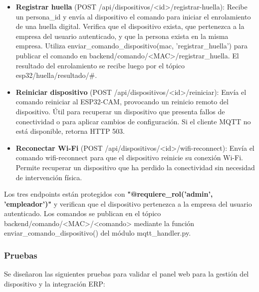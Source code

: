 \begin{itemize}
    \item \textbf{Registrar huella} (POST /api/dispositivos/<id>/registrar-huella): Recibe un persona\_id y envía al dispositivo el comando para iniciar el enrolamiento de una huella digital. Verifica que el dispositivo exista, que pertenezca a la empresa del usuario autenticado, y que la persona exista en la misma empresa. Utiliza enviar\_comando\_dispositivo(mac, 'registrar\_huella') para publicar el comando en backend/comando/<MAC>/registrar\_huella. El resultado del enrolamiento se recibe luego por el tópico esp32/huella/resultado/\#.

    \item \textbf{Reiniciar dispositivo} (POST /api/dispositivos/<id>/reiniciar): Envía el comando reiniciar al ESP32-CAM, provocando un reinicio remoto del dispositivo. Útil para recuperar un dispositivo que presenta fallos de conectividad o para aplicar cambios de configuración. Si el cliente MQTT no está disponible, retorna HTTP 503.

    \item \textbf{Reconectar Wi-Fi} (POST /api/dispositivos/<id>/wifi-reconnect): Envía el comando wifi-reconnect para que el dispositivo reinicie su conexión Wi-Fi. Permite recuperar un dispositivo que ha perdido la conectividad sin necesidad de intervención física.
\end{itemize}

Los tres endpoints están protegidos con \textbf{"@requiere\_rol('admin', 'empleador')"} y verifican que el dispositivo pertenezca a la empresa del usuario autenticado. Los comandos se publican en el tópico backend/comando/<MAC>/<comando> mediante la función enviar\_comando\_dispositivo() del módulo mqtt\_handler.py.

\subsubsection{Pruebas}

Se diseñaron las siguientes pruebas para validar el panel web para la gestión del dispositivo y la integración ERP:

